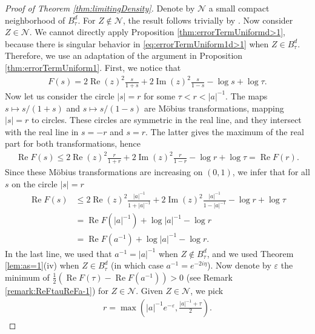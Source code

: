 \documentclass[%
 jmp,
cp,  %
 amsmath,amsthm,amssymb,%
 reprint,%
onecolumn]{revtex4-2}
\begin{document}
\begin{proof}[Proof of Theorem \ref{thm:limitingDensity}]
Denote by $\mathcal N$ a small compact neighborhood of $B_\tau^d$. For $Z\not\in \mathcal N$, the result follows trivially by . Now consider $Z\in \mathcal N$. We cannot directly apply Proposition \ref{thm:errorTermUniformd>1}, because there is singular behavior in \eqref{eq:errorTermUniform1d>1} when $Z\in B_\tau^d$. Therefore, we use an adaptation of the argument in Proposition \ref{thm:errorTermUniform1}. First, we notice that
\begin{align*}
F(s) = 2 \operatorname{Re}(z)^2 \frac{s}{1+s} + 2 \operatorname{Im}(z)^2 \frac{s}{1-s} - \log s + \log \tau. 
\end{align*}
Now let us consider the circle $|s|=r$ for some $\tau<r<|a|^{-1}$. The maps $s\mapsto s/(1+s)$ and $s\mapsto s/(1-s)$ are M\"obius transformations, mapping $|s|=r$ to circles. These circles are symmetric in the real line, and they intersect with the real line in $s=-r$ and $s=r$. The latter gives the maximum of the real part for both transformations, hence
\begin{align*}
\operatorname{Re} F(s) \leq 
2 \operatorname{Re}(z)^2 \frac{r}{1+r} + 2 \operatorname{Im}(z)^2 \frac{r}{1-r} - \log r + \log \tau 
=\operatorname{Re} F(r). 
\end{align*}
Since these M\"obius transformations are increasing on $(0,1)$, we infer that for all $s$ on the circle $|s|=r$
\begin{align} \nonumber
\operatorname{Re} F(s) &\leq 
2 \operatorname{Re}(z)^2 \frac{|a|^{-1}}{1+|a|^{-1}} + 2 \operatorname{Im}(z)^2 \frac{|a|^{-1}}{1-|a|^{-1}} - \log r + \log \tau \\ \nonumber
&= \operatorname{Re} F(|a|^{-1}) + \log |a|^{-1} - \log r\\
 \label{thm:limitingDensityIneqFsFr}
&= \operatorname{Re} F(a^{-1}) + \log |a|^{-1} - \log r.
\end{align}
In the last line, we used that $a^{-1}=|a|^{-1}$ when $Z\not\in B_\tau^d$, and we used Theorem \ref{lem:as=1}(iv) when $Z\in B_\tau^d$ (in which case $a^{-1} = e^{-2i\eta}$). Now denote by $\varepsilon$ the minimum of $\frac{1}{2}(\operatorname{Re} F(\tau) - \operatorname{Re} F(a^{-1})) > 0$ (see Remark \ref{remark:ReFtauReFa-1}) for $Z\in \mathcal N$. Given $Z\in \mathcal N$, we pick
\begin{align*}
r = \max\left(|a|^{-1} e^{-\varepsilon},\frac{|a|^{-1}+\tau}{2}\right).

\end{align*}
\end{proof}
\end{document}
